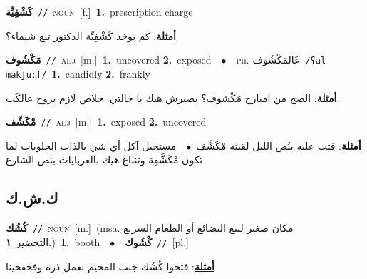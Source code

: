 \documentclass[10pt,a4paper,twoside]{article} %
\begin{document}
\begin{multicols}{2}
{\setlength\topsep{0pt}\textbf{\foreignlanguage{arabic}{كَشْفِيِّة}}\ {\color{gray}\texttt{//}\color{black}}\ \textsc{noun}\ [f.]\ \textbf{1.}~prescription charge\  \begin{flushright}\color{gray}\foreignlanguage{arabic}{\textbf{\underline{\foreignlanguage{arabic}{أمثلة}}}: كم بوخذ كَشْفِيِّة الدكتور تبع شيماء؟}\end{flushright}\color{black}} \vspace{2mm}

{\setlength\topsep{0pt}\textbf{\foreignlanguage{arabic}{مَكْشُوف}}\ {\color{gray}\texttt{//}\color{black}}\ \textsc{adj}\ [m.]\ \textbf{1.}~uncovered  \textbf{2.}~exposed\ \ $\bullet$\ \ \textsc{ph.} \color{gray} \foreignlanguage{arabic}{عَالمَكْشُوف}\color{black}\ {\color{gray}\texttt{/{\sffamily ʕal makʃuːf}/}\color{black}}\ \textbf{1.}~candidly  \textbf{2.}~frankly\  \begin{flushright}\color{gray}\foreignlanguage{arabic}{\textbf{\underline{\foreignlanguage{arabic}{أمثلة}}}: الصح من امبارح مَكْشوف؟ بصيرش هيك يا خالتي. خلاص لازم بروح عالكَب.}\end{flushright}\color{black}} \vspace{2mm}

{\setlength\topsep{0pt}\textbf{\foreignlanguage{arabic}{مْكَشَّف}}\ {\color{gray}\texttt{//}\color{black}}\ \textsc{adj}\ [m.]\ \textbf{1.}~exposed  \textbf{2.}~uncovered\  \begin{flushright}\color{gray}\foreignlanguage{arabic}{\textbf{\underline{\foreignlanguage{arabic}{أمثلة}}}: فتت عليه بنُص الليل لقيته مْكَشَّف\ $\bullet$\ \  مستحيل آكل أي شي بالذات الحلويات لما تكون مْكَشَّفِة وتنباع هيك بالعربايات بنص الشارع}\end{flushright}\color{black}} \vspace{2mm}

\vspace{-3mm}
\subsection*{\color{blue}\foreignlanguage{arabic}{ك.ش.ك}\color{blue}{}} 

{\setlength\topsep{0pt}\textbf{\foreignlanguage{arabic}{كُشُك}}\ {\color{gray}\texttt{//}\color{black}}\ \textsc{noun}\ [m.]\ \color{gray}(msa. \foreignlanguage{arabic}{مكان صغير لبيع البضائع أو الطعام السريع التحضير}~\foreignlanguage{arabic}{\textbf{١.}})\color{black}\ \textbf{1.}~booth\ \ $\bullet$\ \ \setlength\topsep{0pt}\textbf{\foreignlanguage{arabic}{كْشُوك}}\ {\color{gray}\texttt{//}\color{black}}\ [pl.]\  \begin{flushright}\color{gray}\foreignlanguage{arabic}{\textbf{\underline{\foreignlanguage{arabic}{أمثلة}}}: فتحوا كُشُك جنب المخيم بعمل ذرة وفخفخينا}\end{flushright}\color{black}} \vspace{2mm}


\end{multicols}
\end{document}
